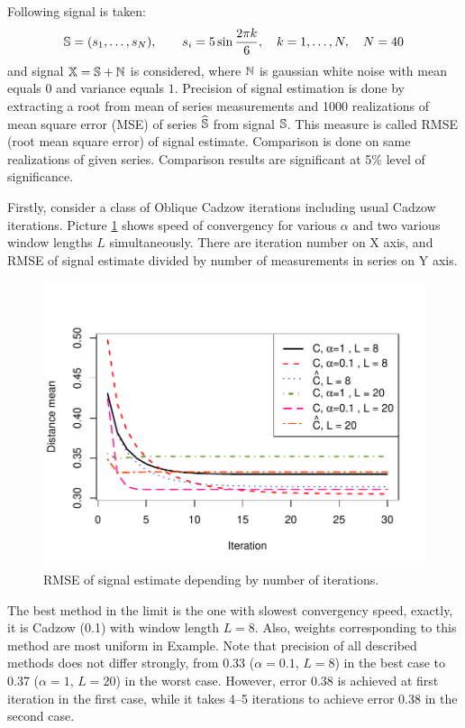\documentclass[12pt,a4paper,fleqn,leqno]{article}
\begin{document}
Following signal is taken:
\begin{equation*}
\mathbb{S} = (s_{1}, \ldots, s_N), \qquad s_{i} = 5\sin{\frac{2 \pi k}{6}}, \quad k = 1, \ldots, N, \quad N = 40
\end{equation*}
and signal $\mathbb{X} = \mathbb{S} + \mathbb{N}$ is considered, where  $\mathbb{N}$ is gaussian white noise with mean equals $0$ and variance equals $1$. Precision of signal estimation is done by extracting a root from mean of series measurements and 1000 realizations of mean square error (MSE) of series $\widehat{\mathbb{S}}$ from signal $\mathbb{S}$. This measure is called RMSE (root mean square error) of signal estimate. Comparison is done on same realizations of given series. Comparison results are significant at 5\% level of significance.

Firstly, consider a class of Oblique Cadzow iterations including usual Cadzow iterations. Picture \ref{img_cadzowspeed2} shows speed of convergency for various $\alpha$ and two various window lengths $L$ simultaneously. There are iteration number on X axis, and RMSE of signal estimate divided by number of measurements in series on Y axis.

\begin{figure}[!hhh]
\begin{center}
\includegraphics[width = \textwidth]{cadzowspeed_2.pdf}
\caption{RMSE of signal estimate depending by number of iterations.}
\label{img_cadzowspeed2}
\end{center}
\end{figure}

The best method in the limit is the one with slowest convergency speed, exactly, it is Cadzow (0.1) with window length $L=8$. Also, weights corresponding to this method are most uniform in Example.
Note that precision of all described methods does not differ strongly, from 0.33 ($\alpha=0.1$, $L=8$) in the best case to 0.37 ($\alpha=1$, $L=20$) in the worst case. However, error 0.38 is achieved at first iteration in the first case, while it takes 4--5 iterations to achieve error 0.38 in the second case.
\end{document}
